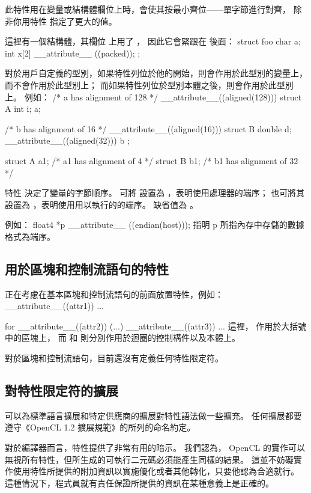 此特性用在變量或結構體欄位上時，會使其按最小齊位——單字節進行對齊，
除非你用特性  指定了更大的值。

這裡有一個結構體，其欄位  上用了 ，
因此它會緊跟在  後面：
\startclc
struct foo
{
	char a;
	int x[2] __attribute__ ((packed));
};
\stopclc
\stopclOption

對於用戶自定義的型別，如果特性列位於他的開始，則會作用於此型別的變量上，而不會作用於此型別上；
而如果特性列位於型別本體之後，則會作用於此型別上。
例如：
\startclc
/* a has alignment of 128 */
__attribute__((aligned(128))) struct A {int i;} a;

/* b has alignment of 16 */
__attribute__((aligned(16))) struct B {double d;}
			__attribute__((aligned(32))) b ;

struct A a1;	/* a1 has alignment of 4 */
struct B b1;	/* b1 has alignment of 32 */
\stopclc

特性  決定了變量的字節順序。
可將  設置為 ，表明使用處理器的端序；
也可將其設置為 ，表明使用用以執行的的端序。
缺省值為 。

例如：
\startclc
float4 *p __attribute__ ((endian(host)));
\stopclc
指明 p 所指內存中存儲的數據格式為端序。
\stopclOption

\subsection{用於區塊和控制流語句的特性}

正在考慮在基本區塊和控制流語句的前面放置特性，例如：
\startclc
__attribute__((attr1)) {...}

for __attribute__((attr2)) (...) __attribute__((attr3)) {...}
\stopclc
這裡，  作用於大括號中的區塊上，
而  和  則分別作用於迴圈的控制構件以及本體上。

對於區塊和控制流語句，目前還沒有定義任何特性限定符。

\subsection{對特性限定符的擴展}

可以為標準語言擴展和特定供應商的擴展對特性語法做一些擴充。
任何擴展都要遵守《OpenCL 1.2 擴展規範》的{}所列的命名約定。

對於編譯器而言，特性提供了非常有用的暗示。
我們認為， OpenCL 的實作可以無視所有特性，但所生成的可執行二元碼必須能產生同樣的結果。
這並不妨礙實作使用特性所提供的附加資訊以實施優化或者其他轉化，只要他認為合適就行。
這種情況下，程式員就有責任保證所提供的資訊在某種意義上是正確的。


